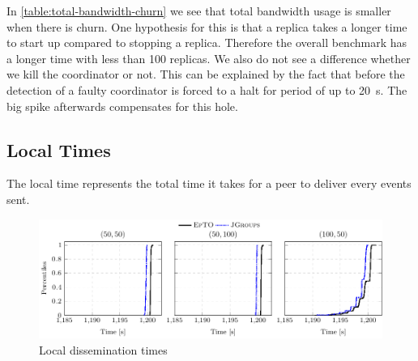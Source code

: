 \begin{table}[hpt]
	\centering
	\caption{Total \si{\giga\byte} sent/received with a synthetic churn}
	\label{table:total-bandwidth-churn} 
\end{table}
In \autoref{table:total-bandwidth-churn} we see that \jgroups total bandwidth usage is smaller when there is churn. One hypothesis for this is that a \jgroups replica takes a longer time to start up compared to stopping a replica. Therefore the overall benchmark has a longer time with less than 100 replicas. We also do not see a difference whether we kill the coordinator or not. This can be explained by the fact that before the detection of a faulty coordinator \jgroups is forced to a halt for period of up to \SI{20}{\second}. The big spike afterwards compensates for this hole.
\subsection{Local Times}
\label{sub:local-times}
The local time represents the total time it takes for a peer to deliver every events sent.
 \begin{figure}[hpt]
 	\centering
 	\includegraphics[width=\linewidth]{figures/local-times-nochurn.pdf}
 	\vspace{-2mm} 
 	\caption{Local dissemination times}
 	\vspace{-2mm}
 	\label{fig:local-times} 
 \end{figure}

